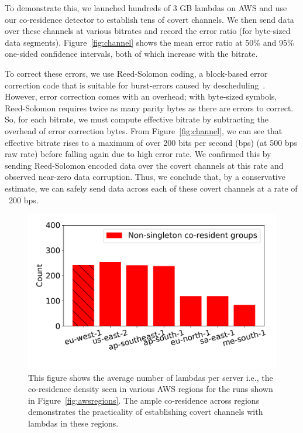 To demonstrate this, we launched hundreds of 3 GB lambdas on AWS and use our
co-residence detector to establish tens of covert channels. We then send data
over these channels at various bitrates and record the error ratio (for
byte-sized data segments). Figure~\ref{fig:channel} shows the mean error ratio
at 50\% and 95\% one-sided confidence intervals, both of which increase with the bitrate.

To correct these errors, we use Reed-Solomon coding, a block-based error correction 
code that is suitable for burst-errors caused by descheduling~\cite{wuusenix2012}. 
However, error correction comes with an overhead; with byte-sized symbols,
Reed-Solomon requires twice as many parity bytes as there are errors to correct. 
So, for each bitrate, we must compute
effective bitrate by subtracting the overhead of error correction bytes.
From Figure~\ref{fig:channel}, we can see that effective bitrate rises to a
maximum of over 200 bits per second (bps) (at 500 bps raw rate) before falling
again due to high error rate. We confirmed this by sending Reed-Solomon encoded
data over the covert channels at this rate and observed near-zero data
corruption. Thus, we conclude that, by a conservative estimate, we can safely
send data across each of these covert channels at a rate of ~200 bps.



\begin{figure}[!t]
  \includegraphics[width=.99\linewidth]{fig/clusters.pdf}
  \caption{This figure shows the average number of lambdas per server i.e., the co-residence 
  density seen in various AWS regions for the runs shown in Figure~\ref{fig:awsregions}. 
  The ample co-residence across regions demonstrates the practicality of establishing 
  covert channels with lambdas in these regions.
\label{fig:clusters}}
\end{figure}


